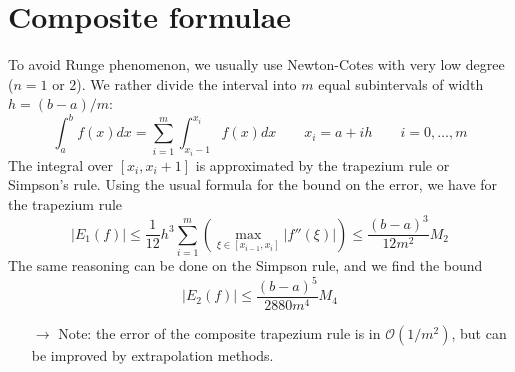 \documentclass[12pt, openany]{report}
\theoremstyle{definition}
\begin{document}
\section{Composite formulae}
To avoid Runge phenomenon, we usually use Newton-Cotes with very low degree ($n=1$ or $2$). We rather divide the interval into $m$ equal subintervals of width $h=(b-a)/m$:
\begin{equation}
    \int_a^b f(x)dx = \sum_{i=1}^m \int_{x_i-1}^{x_i}f(x)dx \qquad x_i = a+ih \qquad i=0,\dots,m
\end{equation}
The integral over $[x_i,x_i+1]$ is approximated by the trapezium rule or Simpson's rule. Using the usual formula for the bound on the error, we have for the trapezium rule
\begin{equation}
    |E_1(f)| \le \frac{1}{12}h^3 \sum_{i=1}^m\left(\max_{\xi\in [x_{i-1},x_i]}|f''(\xi)|\right)\le \frac{(b-a)^3}{12m^2}M_2
\end{equation}
The same reasoning can be done on the Simpson rule, and we find the bound
\begin{equation}
    |E_2(f)| \le \frac{(b-a)^5}{2880m^4}M_4
\end{equation}
\begin{itemize}
    \item [$\rightarrow$] Note: the error of the composite trapezium rule is in $\mathcal{O}(1/m^2)$, but can be improved by extrapolation methods. 
\end{itemize}
\end{document}
